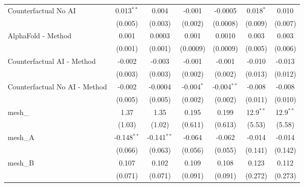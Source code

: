 \begin{tabular}{lcccccc}
   Counterfactual No AI                                        & 0.013$^{**}$   & 0.004         & -0.001        & -0.0005       & 0.018$^{*}$   & 0.010\\   
                                                               & (0.005)        & (0.003)       & (0.002)       & (0.0008)      & (0.009)       & (0.007)\\   
   AlphaFold - Method                                          & 0.001          & 0.0003        & 0.001         & 0.0010        & 0.003         & 0.003\\   
                                                               & (0.001)        & (0.001)       & (0.0009)      & (0.0009)      & (0.005)       & (0.006)\\   
   Counterfactual AI - Method                                  & -0.002         & -0.003        & -0.001        & -0.001        & -0.010        & -0.013\\   
                                                               & (0.003)        & (0.003)       & (0.002)       & (0.002)       & (0.013)       & (0.012)\\   
   Counterfactual No AI - Method                               & -0.002         & -0.0004       & -0.004$^{*}$  & -0.004$^{**}$ & -0.008        & -0.008\\   
                                                               & (0.005)        & (0.005)       & (0.002)       & (0.002)       & (0.011)       & (0.010)\\   
   mesh\_                                                      & 1.37           & 1.35          & 0.195         & 0.199         & 12.9$^{**}$   & 12.9$^{**}$\\   
                                                               & (1.03)         & (1.02)        & (0.611)       & (0.613)       & (5.53)        & (5.58)\\   
   mesh\_A                                                     & -0.148$^{**}$  & -0.141$^{**}$ & -0.064        & -0.062        & -0.014        & -0.014\\   
                                                               & (0.066)        & (0.063)       & (0.056)       & (0.055)       & (0.141)       & (0.142)\\   
   mesh\_B                                                     & 0.107          & 0.102         & 0.109         & 0.108         & 0.123         & 0.112\\   
                                                               & (0.071)        & (0.071)       & (0.091)       & (0.091)       & (0.272)       & (0.273)\\   

\end{tabular}
